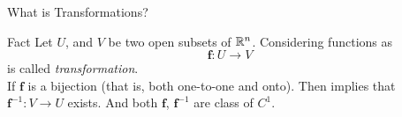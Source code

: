 \begin{frame}{What is Transformations?}
    \begin{parchment}{Fact}
        Let $U$, and $V$ be two open subsets of $\mathbb{R}^n$. Considering functions as
        \begin{equation}
            \mathbf{f}: U \rightarrow V
        \end{equation}
        is called \emph{transformation}. \\
        If $\mathbf{f}$ is a bijection (that is, both one-to-one and onto). Then implies that $\mathbf{f}^{-1}: V \rightarrow U$ exists. And both $\mathbf{f}$, $\mathbf{f}^{-1}$ are class of $C^1$.
    \end{parchment}
    
\end{frame}

